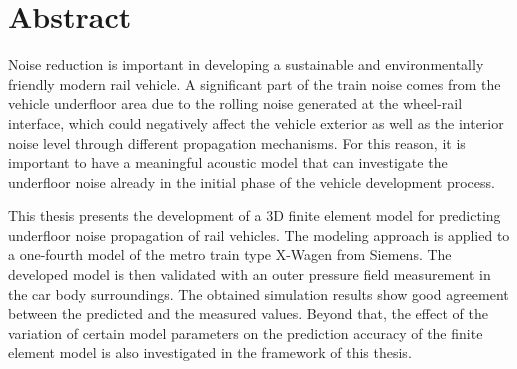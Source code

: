 \section*{Abstract}

Noise reduction is important in developing a sustainable and environmentally friendly modern rail vehicle. A significant part of the train noise comes from the vehicle underfloor area due to the rolling noise generated at the wheel-rail interface, which could negatively affect the vehicle exterior as well as the interior noise level through different propagation mechanisms. For this reason, it is important to have a meaningful acoustic model that can investigate the underfloor noise already in the initial phase of the vehicle development process.

This thesis presents the development of a 3D finite element model for predicting underfloor noise propagation of rail vehicles. The modeling approach is applied to a one-fourth model of the metro train type X-Wagen from Siemens. The developed model is then validated with an outer pressure field measurement in the car body surroundings. The obtained simulation results show good agreement between the predicted and the measured values. Beyond that, the effect of the variation of certain model parameters on the prediction accuracy of the finite element model is also investigated in the framework of this thesis.
